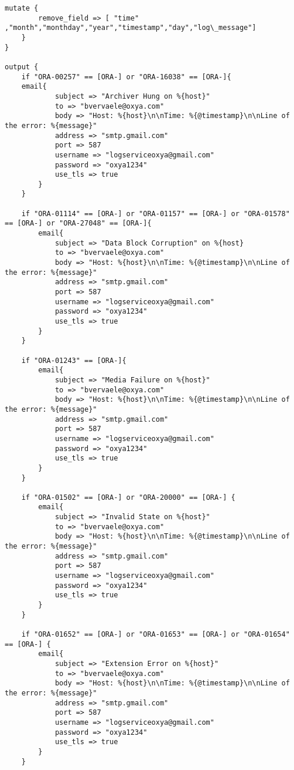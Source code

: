 \begin{lstlisting}[frame=single]
    mutate {
        remove_field => [ "time" ,"month","monthday","year","timestamp","day","log\_message"]
    }
}
 
output {
    if "ORA-00257" == [ORA-] or "ORA-16038" == [ORA-]{        
    email{
            subject => "Archiver Hung on %{host}"
            to => "bvervaele@oxya.com"
            body => "Host: %{host}\n\nTime: %{@timestamp}\n\nLine of the error: %{message}"
            address => "smtp.gmail.com"
            port => 587
            username => "logserviceoxya@gmail.com"
            password => "oxya1234"
            use_tls => true
        }
    }

    if "ORA-01114" == [ORA-] or "ORA-01157" == [ORA-] or "ORA-01578" == [ORA-] or "ORA-27048" == [ORA-]{
        email{
            subject => "Data Block Corruption" on %{host}
            to => "bvervaele@oxya.com"
            body => "Host: %{host}\n\nTime: %{@timestamp}\n\nLine of the error: %{message}"
            address => "smtp.gmail.com"
            port => 587
            username => "logserviceoxya@gmail.com"
            password => "oxya1234"
            use_tls => true
        }
    }

    if "ORA-01243" == [ORA-]{
        email{
            subject => "Media Failure on %{host}"
            to => "bvervaele@oxya.com"
            body => "Host: %{host}\n\nTime: %{@timestamp}\n\nLine of the error: %{message}"
            address => "smtp.gmail.com"
            port => 587
            username => "logserviceoxya@gmail.com"
            password => "oxya1234"
            use_tls => true
        }
    }

    if "ORA-01502" == [ORA-] or "ORA-20000" == [ORA-] {
        email{
            subject => "Invalid State on %{host}"
            to => "bvervaele@oxya.com"
            body => "Host: %{host}\n\nTime: %{@timestamp}\n\nLine of the error: %{message}"
            address => "smtp.gmail.com"
            port => 587
            username => "logserviceoxya@gmail.com"
            password => "oxya1234"
            use_tls => true
        }
    }

    if "ORA-01652" == [ORA-] or "ORA-01653" == [ORA-] or "ORA-01654" == [ORA-] {
        email{
            subject => "Extension Error on %{host}"
            to => "bvervaele@oxya.com"
            body => "Host: %{host}\n\nTime: %{@timestamp}\n\nLine of the error: %{message}"
            address => "smtp.gmail.com"
            port => 587
            username => "logserviceoxya@gmail.com"
            password => "oxya1234"
            use_tls => true
        }
    }


\end{lstlisting}
